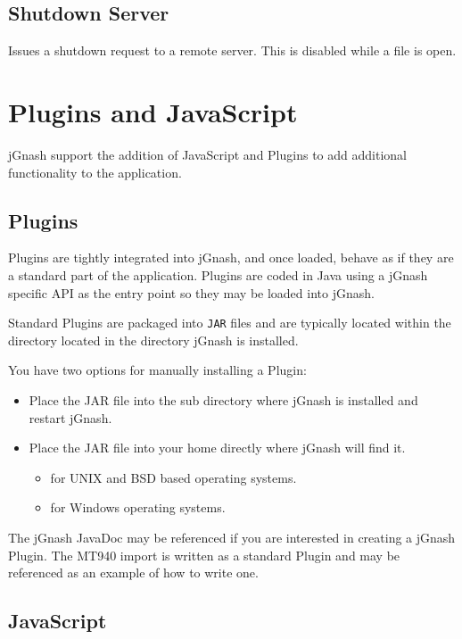 \documentclass[letterpaper,12pt]{book}
\begin{document}
    \section{Shutdown Server}
    Issues a shutdown request to a remote server.
    This is disabled while a file is open.


    \chapter{Plugins and JavaScript}
    jGnash support the addition of JavaScript and Plugins to add additional functionality to the application.

    \section{Plugins}
    Plugins are tightly integrated into jGnash, and once loaded, behave as if they are a standard part of the application.
    Plugins are coded in Java using a jGnash specific API as the entry point so they may be loaded into jGnash.

    Standard Plugins are packaged into \texttt{JAR} files and are typically located within the 
    directory located in the directory jGnash is installed.

    You have two options for manually installing a Plugin:
    \begin{itemize}
        \item Place the JAR file into the  sub directory where jGnash is installed and restart jGnash.
        \item Place the JAR file into your home directly where jGnash will find it.
        \begin{itemize}
            \item {} for UNIX and BSD based operating systems.
            \item {} for Windows operating systems.
        \end{itemize}
    \end{itemize}

    The jGnash JavaDoc may be referenced if you are interested in creating a jGnash Plugin.
    The MT940 import is written as a standard Plugin and may be referenced as an example of how to write one.

    \section{JavaScript}
    \label{sec:javascript}
\end{document}
